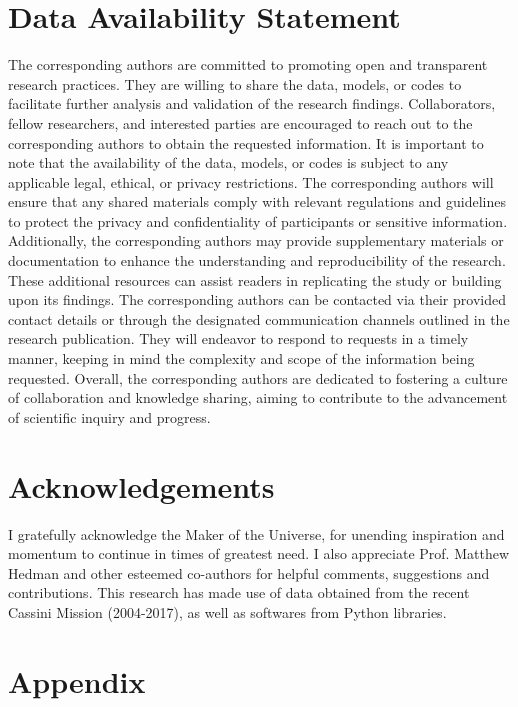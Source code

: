 \documentclass{article}
\begin{document}
\section{Data Availability Statement}
The corresponding authors are committed to promoting open and transparent research practices. They are willing to share the data, models, or codes to facilitate further analysis and validation of the research findings. Collaborators, fellow researchers, and interested parties are encouraged to reach out to the corresponding authors to obtain the requested information. It is important to note that the availability of the data, models, or codes is subject to any applicable legal, ethical, or privacy restrictions. The corresponding authors will ensure that any shared materials comply with relevant regulations and guidelines to protect the privacy and confidentiality of participants or sensitive information. Additionally, the corresponding authors may provide supplementary materials or documentation to enhance the understanding and reproducibility of the research. These additional resources can assist readers in replicating the study or building upon its findings. The corresponding authors can be contacted via their provided contact details or through the designated communication channels outlined in the research publication. They will endeavor to respond to requests in a timely manner, keeping in mind the complexity and scope of the information being requested. Overall, the corresponding authors are dedicated to fostering a culture of collaboration and knowledge sharing, aiming to contribute to the advancement of scientific inquiry and progress.

\section{Acknowledgements}
I gratefully acknowledge the Maker of the Universe, for unending inspiration and momentum to continue in times of greatest need. I also appreciate Prof. Matthew Hedman and other esteemed co-authors for helpful comments, suggestions and contributions. This research has made use of data obtained from the recent Cassini Mission (2004-2017), as well as softwares from Python libraries. 


\section{Appendix}
\label{sec:appendix}
\end{document}
